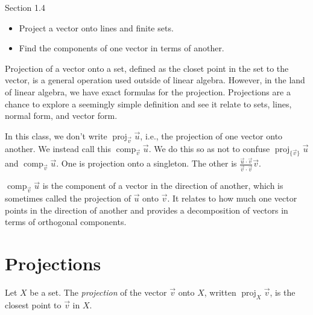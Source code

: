 \documentclass{problemset}
\DeclareMathOperator{\Comp}{comp}
\DeclareMathOperator{\Proj}{proj}
\begin{document}
\begin{lesson}
	\newpage

	Section 1.4

	\begin{itemize}
		\item Project a vector onto lines and finite sets.
		\item Find the components of one vector in terms of another.
	\end{itemize}

	Projection of a vector onto a set, defined as the closet point in the
	set to the vector, is a general operation used outside of linear algebra.
	However, in the land of linear algebra, we have exact formulas for the
	projection. Projections are a chance to explore a seemingly simple definition
	and see it relate to sets, lines, normal form, and vector form.

	\begin{annotation}
		\begin{notes}
			In this class, we don't write $\Proj_{\vec v}\vec u$,
			i.e., the projection of one vector onto another. We
			instead call this $\Comp_{\vec v}\vec u$. We do this so
			as not to confuse $\Proj_{\{\vec v\}}\vec u$ and
			$\Comp_{\vec v}\vec u$. One is projection onto a singleton.
			The other is $\frac{\vec u\cdot \vec v}{\vec v\cdot \vec v}\vec v$.
		\end{notes}
	\end{annotation}
	$\Comp_{\vec v}\vec u$ is the component of a vector in the direction of another, 
	which is sometimes called the projection of $\vec u$ onto $\vec v$. It relates
	to how much one vector points in the direction of another and
	provides a decomposition of vectors in terms of orthogonal components. 
	

	\newpage
\end{lesson}
\section*{Projections}
	
	\begin{definition}[Projection]
		Let $X$ be a set. The \emph{projection} of the vector $\vec v$
		onto $X$, written $\Proj_X\vec v$, is the closest point to $\vec v$ in $X$.
	\end{definition}
\end{document}

